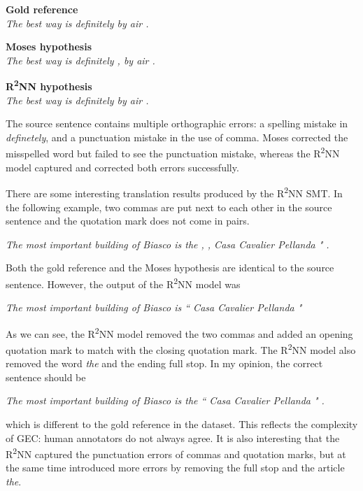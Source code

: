 \documentclass[12pt,a4paper,twoside,openright]{report}
\begin{document}
\textbf{Gold reference}\\
\textit{The best way is definitely by air .}

\textbf{Moses hypothesis}\\
\textit{The best way is definitely , by air . }

\textbf{R\textsuperscript{2}NN hypothesis}\\
\textit{The best way is definitely by air .}

The source sentence contains multiple orthographic errors: a spelling mistake in \textit{definetely}, and a punctuation mistake in the use of comma. Moses corrected the misspelled word but failed to see the punctuation mistake, whereas the R\textsuperscript{2}NN model captured and corrected both errors successfully.

There are some interesting translation results produced by the R\textsuperscript{2}NN SMT. In the following example, two commas are put next to each other in the source sentence and the quotation mark does not come in pairs.

\begin{center}
    \textit{The most important building of Biasco is the , , Casa Cavalier Pellanda " .}
\end{center}

Both the gold reference and the Moses hypothesis are identical to the source sentence. However, the output of the R\textsuperscript{2}NN model was
\begin{center}
    \textit{The most important building of Biasco is `` Casa Cavalier Pellanda "}
\end{center}

As we can see, the R\textsuperscript{2}NN model removed the two commas and added an opening quotation mark to match with the closing quotation mark. The R\textsuperscript{2}NN model also removed the word \textit{the} and the ending full stop. In my opinion, the correct sentence should be
\begin{center}
    \textit{The most important building of Biasco is the `` Casa Cavalier Pellanda " .}
\end{center}
which is different to the gold reference in the dataset. This reflects the complexity of GEC: human annotators do not always agree. It is also interesting that the R\textsuperscript{2}NN captured the punctuation errors of commas and quotation marks, but at the same time introduced more errors by removing the full stop and the article \textit{the}. 
\end{document}

